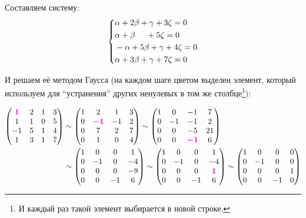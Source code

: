 \documentclass[a4paper,12pt]{article}
\begin{document}
  Составляем систему:
  \[
    \left\{
      \begin{aligned}
        &\alpha + 2\beta + \gamma + 3\zeta = 0\\
        &\alpha + \beta \hphantom{+ \gamma} + 5\zeta = 0\\
        &-\alpha + 5\beta + \gamma + 4\zeta = 0\\
        &\alpha + 3\beta + \gamma + 7\zeta = 0
      \end{aligned}
    \right.
  \]
  
  И решаем её методом Гаусса (на каждом шаге цветом выделен элемент, который используем для ``устранения'' других ненулевых в том же столбце\footnote{И каждый раз такой элемент выбирается в новой строке.}):
  
  \begin{equation}\label{p-20-18-independence}
  \begin{split}
    \begin{pmatrix}
      \textcolor{pink}{\bds 1} & 2 & 1 & 3\\
      1 & 1 & 0 & 5\\
      -1 & 5 & 1 & 4\\
      1 & 3 & 1 & 7
    \end{pmatrix}
    &\sim \begin{pmatrix}
      1 & 2 & 1 & 3\\
      0 & \textcolor{pink}{\bds{-1}} & -1 & 2\\
      0 & 7 & 2 & 7\\
      0 & 1 & 0 & 4
    \end{pmatrix}
    \sim \begin{pmatrix}
      1 & 0 & -1 & 7\\
      0 & -1 & -1 & 2\\
      0 & 0 & -5 & 21\\
      0 & 0 & \textcolor{pink}{\bds{-1}} & 6
    \end{pmatrix}\\
    &\sim \begin{pmatrix}
      1 & 0 & 0 & 1\\
      0 & -1 & 0 & -4\\
      0 & 0 & 0 & -9\\
      0 & 0 & -1 & 6
    \end{pmatrix}
    \sim \begin{pmatrix}
      1 & 0 & 0 & 1\\
      0 & -1 & 0 & -4\\
      0 & 0 & 0 & \textcolor{pink}{\bds 1}\\
      0 & 0 & -1 & 6
    \end{pmatrix}
    \sim \begin{pmatrix}
      1 & 0 & 0 & 0\\
      0 & -1 & 0 & 0\\
      0 & 0 & 0 & 1\\
      0 & 0 & -1 & 0
    \end{pmatrix}
  \end{split}
  \end{equation}
  
\end{document}
